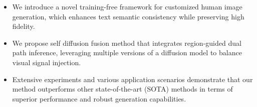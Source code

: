 \begin{itemize}
    \item We introduce a novel training-free framework for customized human image generation, which enhances text semantic consistency while preserving high fidelity.
    \item We propose self diffusion fusion method that integrates region-guided dual path inference, leveraging multiple versions of a diffusion model to balance visual signal injection.
    \item Extensive experiments and various application scenarios demonstrate that our method outperforms other state-of-the-art (SOTA) methods in terms of superior performance and robust generation capabilities.
\end{itemize}





